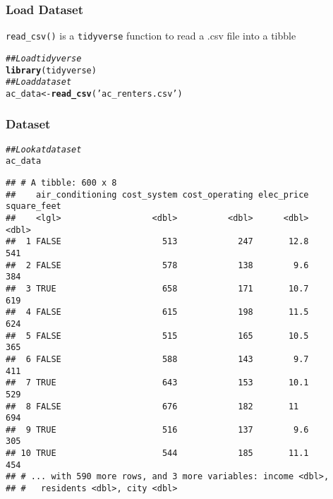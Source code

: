 \documentclass{beamer}\usepackage[]{graphicx}\usepackage[]{color}
\makeatletter
\newcommand{\hlstr}[1]{\textcolor[rgb]{0.192,0.494,0.8}{#1}}%
\newcommand{\hlcom}[1]{\textcolor[rgb]{0.678,0.584,0.686}{\textit{#1}}}%
\newcommand{\hlstd}[1]{\textcolor[rgb]{0.345,0.345,0.345}{#1}}%
\newcommand{\hlkwb}[1]{\textcolor[rgb]{0.69,0.353,0.396}{#1}}%
\newcommand{\hlkwd}[1]{\textcolor[rgb]{0.737,0.353,0.396}{\textbf{#1}}}%
\newenvironment{kframe}{%
 \def\at@end@of@kframe{}%
 \ifinner\ifhmode%
  \def\at@end@of@kframe{\end{minipage}}%
  \begin{minipage}{\columnwidth}%
 \fi\fi%
 \def\FrameCommand##1{\hskip\@totalleftmargin \hskip-\fboxsep
 \colorbox{shadecolor}{##1}\hskip-\fboxsep
     \hskip-\linewidth \hskip-\@totalleftmargin \hskip\columnwidth}%
 \MakeFramed {\advance\hsize-\width
   \@totalleftmargin\z@ \linewidth\hsize
   \@setminipage}}%
 {\par\unskip\endMakeFramed%
 \at@end@of@kframe}
\newenvironment{knitrout}{}{} %
\makeatother
\begin{document}
\begin{frame}[fragile]\frametitle{Load Dataset}
    \texttt{read\_csv()} is a \texttt{tidyverse} function to read a .csv file into a tibble
\begin{knitrout}\footnotesize
{}\color{fgcolor}\begin{kframe}
\begin{alltt}
\hlcom{## Load tidyverse}
\hlkwd{library}\hlstd{(tidyverse)}
\hlcom{## Load dataset}
\hlstd{ac_data} \hlkwb{<-} \hlkwd{read_csv}\hlstd{(}\hlstr{'ac_renters.csv'}\hlstd{)}
\end{alltt}
\end{kframe}
\end{knitrout}
\end{frame}

\begin{frame}[fragile]\frametitle{Dataset}
\begin{knitrout}\footnotesize
{}\color{fgcolor}\begin{kframe}
\begin{alltt}
\hlcom{## Look at dataset}
\hlstd{ac_data}
\end{alltt}
\begin{verbatim}
## # A tibble: 600 x 8
##    air_conditioning cost_system cost_operating elec_price square_feet
##    <lgl>                  <dbl>          <dbl>      <dbl>       <dbl>
##  1 FALSE                    513            247       12.8         541
##  2 FALSE                    578            138        9.6         384
##  3 TRUE                     658            171       10.7         619
##  4 FALSE                    615            198       11.5         624
##  5 FALSE                    515            165       10.5         365
##  6 FALSE                    588            143        9.7         411
##  7 TRUE                     643            153       10.1         529
##  8 FALSE                    676            182       11           694
##  9 TRUE                     516            137        9.6         305
## 10 TRUE                     544            185       11.1         454
## # ... with 590 more rows, and 3 more variables: income <dbl>,
## #   residents <dbl>, city <dbl>
\end{verbatim}
\end{kframe}
\end{knitrout}
\end{frame}
\end{document}
